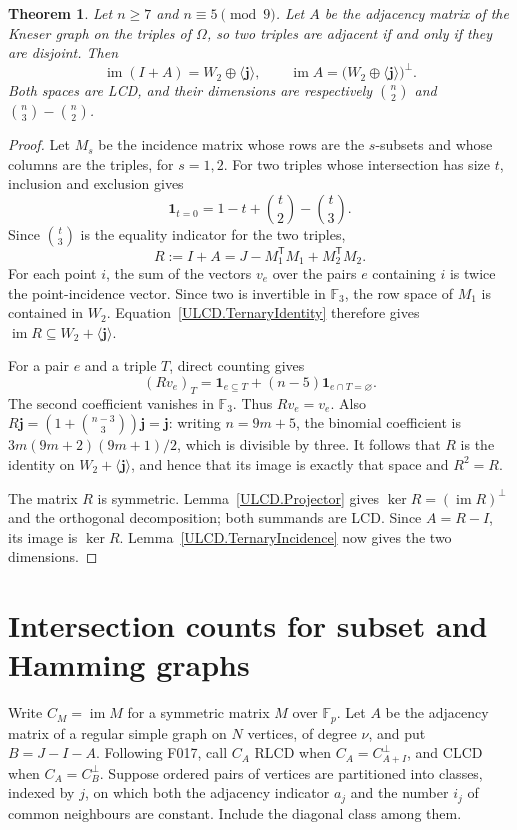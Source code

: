 \documentclass[11pt,a4paper]{article}
\newtheorem{theorem}{Theorem}[section]
\numberwithin{equation}{section}
\newcommand{\im}{\operatorname{im}}
\begin{document}
\begin{theorem}\label{ULCD.TernaryKneser}
Let $n\geq7$ and $n\equiv5\pmod9$. Let $A$ be the adjacency matrix of
the Kneser graph on the triples of $\Omega$, so two triples are adjacent
if and only if they are disjoint. Then
\[
 \im(I+A)=W_2\oplus\langle\mathbf j\rangle,
 \qquad \im A=\bigl(W_2\oplus\langle\mathbf j\rangle\bigr)^\perp.
\]
Both spaces are LCD, and their dimensions are respectively
$\binom n2$ and $\binom n3-\binom n2$.
\end{theorem}
\begin{proof}
Let $M_s$ be the incidence matrix whose rows are the $s$-subsets and
whose columns are the triples, for $s=1,2$. For two triples whose
intersection has size $t$, inclusion and exclusion gives
\[
 \mathbf1_{t=0}=1-t+\binom t2-\binom t3.
\]
Since $\binom t3$ is the equality indicator for the two triples,
\begin{equation}\label{ULCD.TernaryIdentity}
 R:=I+A=J-M_1^{\mathsf T}M_1+M_2^{\mathsf T}M_2.
\end{equation}
For each point $i$, the sum of the vectors $v_e$ over the pairs $e$
containing $i$ is twice the point-incidence vector. Since two is
invertible in $\mathbb F_3$, the row space of $M_1$ is contained in
$W_2$. Equation~\eqref{ULCD.TernaryIdentity} therefore gives
$\im R\subseteq W_2+\langle\mathbf j\rangle$.

For a pair $e$ and a triple $T$, direct counting gives
\[
 (Rv_e)_T=\mathbf1_{e\subseteq T}
          +(n-5)\mathbf1_{e\cap T=\varnothing}.
\]
The second coefficient vanishes in $\mathbb F_3$. Thus $Rv_e=v_e$.
Also $R\mathbf j=(1+\binom{n-3}{3})\mathbf j=\mathbf j$:
writing $n=9m+5$, the binomial coefficient is
$3m(9m+2)(9m+1)/2$, which is divisible by three.
It follows that $R$ is the identity on $W_2+\langle\mathbf j\rangle$,
and hence that its image is exactly that space and $R^2=R$.

The matrix $R$ is symmetric. Lemma~\ref{ULCD.Projector} gives $\ker R=(\im R)^\perp$ and the orthogonal decomposition; both summands are LCD. Since $A=R-I$, its image is $\ker R$.
Lemma~\ref{ULCD.TernaryIncidence} now gives the two dimensions.
\end{proof}

\section{Intersection counts for subset and Hamming graphs}

Write $C_M=\im M$ for a symmetric matrix $M$ over $\mathbb F_p$. Let $A$
be the adjacency matrix of a regular simple graph on $N$ vertices, of degree
$\nu$, and put $B=J-I-A$. Following F017, call $C_A$ RLCD when
$C_A=C_{A+I}^{\perp}$, and CLCD when $C_A=C_B^{\perp}$.
Suppose ordered pairs of vertices are partitioned into classes, indexed
by $j$, on which both the adjacency indicator $a_j$ and the number $i_j$
of common neighbours are constant. Include the diagonal class among them.
\end{document}
